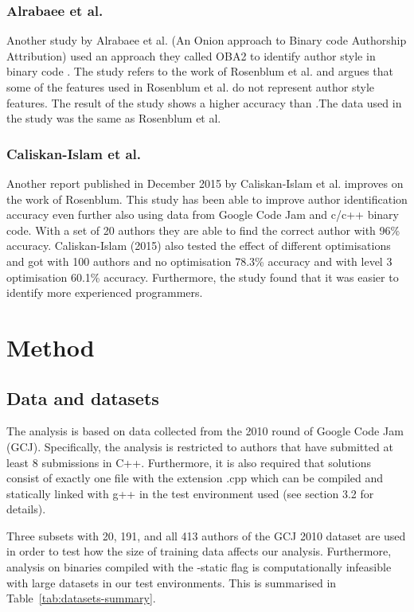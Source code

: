 \documentclass[a4paper,11pt]{kth-mag}
\begin{document}
\subsection{Alrabaee et al.}
Another study by Alrabaee et al. (An Onion approach to Binary code Authorship
Attribution) used an approach they called OBA2 to identify author style in
binary code \parencite{alrabaee2014oba2}. The study refers to the work of
Rosenblum et al. and argues that some of the features used in Rosenblum et al.
do not represent author style features. The result of the study
shows a higher accuracy than \parencite{rosenblum2011wrote}.The data used in
the study was the same as Rosenblum et al. 

\subsection{Caliskan-Islam et al.}
Another report published in December 2015 by Caliskan-Islam et al. improves on
the work of Rosenblum. This study has been able to improve author
identification accuracy even further also using data from Google Code Jam and
c/c++ binary code. With a set of 20 authors they are able to find the correct
author with 96\% accuracy. Caliskan-Islam (2015) also tested the effect of
different optimisations and got with 100 authors and no optimisation 78.3\%
accuracy and with level 3 optimisation 60.1\% accuracy. Furthermore, the study
found that it was easier to identify more experienced programmers.

\chapter{Method} \label{ch:method}
\section{Data and datasets} \label{data-datasets}
The analysis is based on data collected from the 2010 round of Google Code Jam
(GCJ). Specifically, the analysis is restricted to authors that have submitted at
least 8 submissions in C++. Furthermore, it is also required that solutions consist of exactly
one file with the extension .cpp which can be compiled and statically linked
with g++ in the test environment used (see section 3.2 for details).

Three subsets with 20, 191, and all 413 authors of the GCJ 2010 dataset are
used in order to test how the size of training data affects our analysis.
Furthermore, analysis on binaries compiled with the -static flag is
computationally infeasible with large datasets in our test environments. This
is summarised in Table~\ref{tab:datasets-summary}.
\end{document}
